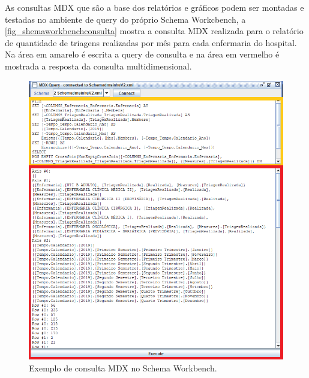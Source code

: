 As consultas MDX que são a base dos relatórios e gráficos podem ser montadas e testadas no ambiente de query do próprio Schema Workcbench, a \autoref{fig_shemaworkbenchconsulta} mostra a consulta MDX realizada para o relatório de quantidade de triagens realizadas por mês para cada enfermaria do hospital. Na área em amarelo é escrita a query de consulta e na área em vermelho é mostrada a resposta da consulta multidimensional.
\begin{figure}[htb]
	\caption{\label{fig_shemaworkbenchconsulta}Exemplo de consulta MDX no Schema Workbench.}
	\begin{center}
	    \includegraphics[scale=0.7]{Imagens/figura - workbenchconsulta.png}
	\end{center}
\end{figure}

